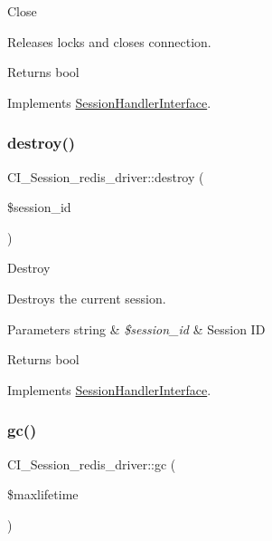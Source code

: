 Close

Releases locks and closes connection.

\begin{DoxyReturn}{Returns}
bool 
\end{DoxyReturn}


Implements \mbox{\hyperlink{interface_session_handler_interface}{Session\+Handler\+Interface}}.

\mbox{\label{class_c_i___session__redis__driver_a8a1ac68fa77b2f654ffadc365d125fe5}} 
\subsubsection{\texorpdfstring{destroy()}{destroy()}}
{\footnotesize\ttfamily C\+I\+\_\+\+Session\+\_\+redis\+\_\+driver\+::destroy (\begin{DoxyParamCaption}\item[{}]{\$session\+\_\+id }\end{DoxyParamCaption})}

Destroy

Destroys the current session.


\begin{DoxyParams}[1]{Parameters}
string & {\em \$session\+\_\+id} & Session ID \\
\hline
\end{DoxyParams}
\begin{DoxyReturn}{Returns}
bool 
\end{DoxyReturn}


Implements \mbox{\hyperlink{interface_session_handler_interface}{Session\+Handler\+Interface}}.

\mbox{\label{class_c_i___session__redis__driver_ae65e8f9d43d2c4ca690202c9d56d1d01}} 
\subsubsection{\texorpdfstring{gc()}{gc()}}
{\footnotesize\ttfamily C\+I\+\_\+\+Session\+\_\+redis\+\_\+driver\+::gc (\begin{DoxyParamCaption}\item[{}]{\$maxlifetime }\end{DoxyParamCaption})}

